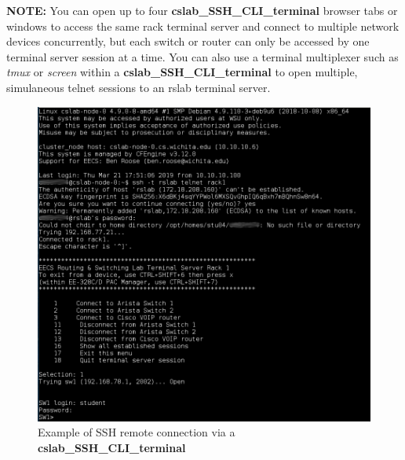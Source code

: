 \documentclass[12pt]{article}
\newcommand{\question}[1] %
{
\refstepcounter{questions} %
\par\noindent %
\phantomsection %
\addcontentsline{faq}{questions}{#1} %
\todo[inline, color=green!40]{\textbf{#1}} %
\vspace{1em} %
}
\begin{document}
\begin{flushleft}
\bigskip

\textbf{NOTE:} You can open up to four \textbf{cslab\_SSH\_CLI\_terminal} browser tabs or windows to access the same rack terminal server and connect to multiple network devices concurrently, but each switch or router can only be accessed by one terminal server session at a time. You can also use a terminal multiplexer such as \textit{tmux} or \textit{screen} within a \textbf{cslab\_SSH\_CLI\_terminal} to open multiple, simulaneous telnet sessions to an rslab terminal server.

\newpage

\begin{figure}[h]
\caption{Example of SSH remote connection via a \textbf{cslab\_SSH\_CLI\_terminal}}
\includegraphics[width=\linewidth]{rslab_ssh_from_cslab}
\centering
\end{figure}




\end{flushleft}
\end{document}
